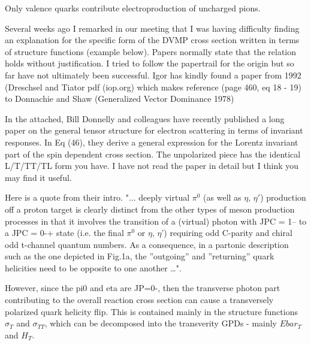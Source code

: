                       Only valence quarks contribute electroproduction of uncharged pions.
               
            Several weeks ago I remarked in our meeting that I was having difficulty finding an explanation for the specific form of the DVMP cross section written in terms of structure functions (example below). Papers normally state that the relation holds without justification. I tried to follow the papertrail for the origin but so far have not ultimately been successful. Igor has kindly found a paper from 1992 (Dreschsel and Tiator pdf (iop.org) which makes reference (page 460, eq 18 - 19) \parencite{Dreschsel1992ThresholdNucleons}
            \parencite{Bedlinskiy2014ExclusiveCLAS} to Donnachie and Shaw (Generalized Vector Dominance 1978) \parencite{Donnachie1978GeneralizedDominance}
            
            
            In the attached, Bill Donnelly and colleagues have recently published a long paper
            on the general tensor structure for electron scattering in terms of invariant responses.
            In Eq (46), they derive a general expression for the Lorentz invariant part of the spin \parencite{Donnelly2023GeneralResponses}
            dependent cross section.  The unpolarized piece has the identical L/T/TT/TL form you have.
            I have not read the paper in detail but I think you may find it useful.


            
            Here is a quote from their intro.
            "... deeply virtual $\pi^0$ (as well as $\eta$, $\eta'$) production off a proton target is clearly distinct from the other types of meson production processes in that it involves the transition of a (virtual) photon with JPC = 1-- to a JPC = 0-+ state (i.e. the final $\pi^0$ or $\eta$, $\eta$') requiring odd C-parity and chiral odd t-channel quantum numbers. As a consequence, in a partonic description such as the one depicted in Fig.1a, the ”outgoing” and ”returning” quark helicities need to be opposite to one another …". 

    
        	However,  since the pi0 and eta are JP=0-, then the transverse photon part contributing to the overall reaction cross section can cause a transversely polarized  quark helicity flip. This is contained mainly  in the structure functions $\sigma_T$ and $\sigma_{TT}$, which can be decomposed into the transverity GPDs - mainly $Ebar_T$ and $H_T$. 
        	
